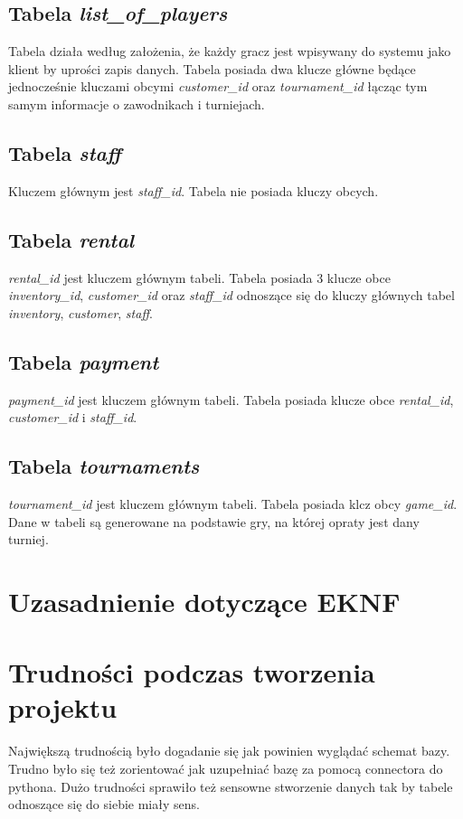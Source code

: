 \documentclass[12pt,a4paper]{article}
\begin{document}
\subsection{Tabela \textit{list\_of\_players}}
Tabela działa według założenia, że każdy gracz jest wpisywany do systemu jako klient by uprości zapis danych.
Tabela posiada dwa klucze główne będące jednocześnie kluczami obcymi \textit{customer\_id} oraz \textit{tournament\_id} łącząc tym samym informacje o zawodnikach i turniejach.

\subsection{Tabela \textit{staff}}
Kluczem głównym jest \textit{staff\_id}. Tabela nie posiada kluczy obcych.

\subsection{Tabela \textit{rental}}
\textit{rental\_id} jest kluczem głównym tabeli.
Tabela posiada 3 klucze obce \textit{inventory\_id}, \textit{customer\_id} oraz \textit{staff\_id} odnoszące się do kluczy głównych tabel \textit{inventory}, \textit{customer}, \textit{staff}.

\subsection{Tabela \textit{payment}}
\textit{payment\_id} jest kluczem głównym tabeli.
Tabela posiada klucze obce \textit{rental\_id}, \textit{customer\_id} i \textit{staff\_id}.

\subsection{Tabela \textit{tournaments}}
\textit{tournament\_id} jest kluczem głównym tabeli.
Tabela posiada klcz obcy \textit{game\_id}. Dane w tabeli są generowane na podstawie gry, na której opraty jest dany turniej.


\section{Uzasadnienie dotyczące EKNF}


\section{Trudności podczas tworzenia projektu}
Największą trudnością było dogadanie się jak powinien wyglądać schemat bazy. Trudno było się też zorientować jak
uzupełniać bazę za pomocą connectora do pythona. Dużo trudności sprawiło też sensowne stworzenie danych tak by tabele
odnoszące się do siebie miały sens.
\end{document}
